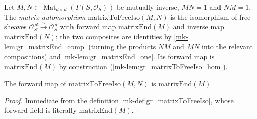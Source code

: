\begin{definition}\label{mk-def:gr_matrixToFreeIso}
  \leanok

  Let \(M, N \in \operatorname{Mat}_{d \times d}(\Gamma(S, \mathcal{O}_S))\) be mutually
  inverse, \(M N = 1\) and \(N M = 1\). The \emph{matrix automorphism}
  \(\mathrm{matrixToFreeIso}(M, N)\) is the isomorphism of free sheaves
  \(\mathcal{O}_S^{\,d} \xrightarrow{\sim} \mathcal{O}_S^{\,d}\) with forward map
  \(\mathrm{matrixEnd}(M)\) and inverse map \(\mathrm{matrixEnd}(N)\); the two
  composites are identities by \ref{mk-lem:gr_matrixEnd_comp} (turning the products
  \(NM\) and \(MN\) into the relevant compositions) and \ref{mk-lem:gr_matrixEnd_one}.
  Its forward map is \(\mathrm{matrixEnd}(M)\) by construction
  (\ref{mk-lem:gr_matrixToFreeIso_hom}).
\end{definition}

\begin{lemma}\label{mk-lem:gr_matrixToFreeIso_hom}
  \leanok

  The forward map of \(\mathrm{matrixToFreeIso}(M, N)\) is \(\mathrm{matrixEnd}(M)\).
\end{lemma}
\begin{proof}
  Immediate from the definition \ref{mk-def:gr_matrixToFreeIso}, whose forward field is
  literally \(\mathrm{matrixEnd}(M)\).
\end{proof}

